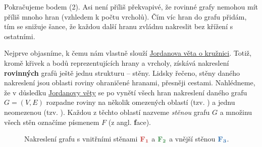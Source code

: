 Pokračujeme bodem (2). Asi není příliš překvapivé, že rovinné grafy nemohou mít
příliš mnoho hran (vzhledem k počtu vrcholů). Čím víc hran do grafu přidám, tím
se snižuje šance, že každou další hranu zvládnu nakreslit bez křížení s
ostatními.

Nejprve objasníme, k čemu nám vlastně slouží
\hyperref[thm:jordanova-o-kruznici]{Jordanova věta o kružnici}. Totiž, kromě
křivek a bodů reprezentujících hrany a vrcholy, získává nakreslení
\textbf{rovinných} grafů ještě jednu strukturu -- stěny. Lidsky řečeno, stěny
daného nakreslení jsou oblasti roviny ohraničené hranami, přesněji cestami.
Nahlédneme, že v důsledku \hyperref[thm:jordanova-o-kruznici]{Jordanovy věty} se
po vynětí všech hran nakreslení daného grafu $G = (V,E)$ rozpadne roviny na
několik omezených oblastí (tzv. ) a jednu neomezenou (tzv.
). Každou z těchto oblastí nazveme \emph{stěnou} grafu $G$ a
množinu všech stěn označíme písmenem $F$ (z angl. \textbf{f}ace).

\begin{figure}[h]
 \centering

 \caption{Nakreslení grafu s vnitřními stěnami $\mathbf{\clr{F_1}}$ a
  $\mathbf{\clg{F_2}}$ a vnější stěnou $\mathbf{\clb{F_3}}$.}
 \label{fig:steny-nakresleni}
\end{figure}

